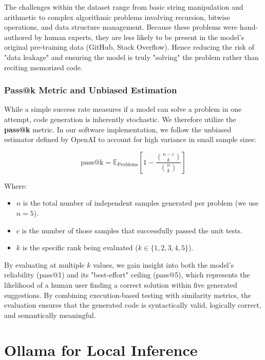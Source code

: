 The challenges within the dataset range from basic string manipulation and arithmetic to complex algorithmic problems involving recursion, bitwise operations, and data structure management. Because these problems were hand-authored by human experts, they are less likely to be present in the model's original pre-training data (GitHub, Stack Overflow). Hence reducing the risk of "data leakage" and ensuring the model is truly "solving" the problem rather than reciting memorized code.

\subsubsection{Pass@k Metric and Unbiased Estimation}
While a simple success rate measures if a model can solve a problem in one attempt, code generation is inherently stochastic. We therefore utilize the \textbf{pass@k} metric. In our software implementation, we follow the unbiased estimator defined by OpenAI to account for high variance in small sample sizes:

\begin{equation}
\text{pass@k} = \mathbb{E}_{\text{Problems}} \left[ 1 - \frac{\binom{n-c}{k}}{\binom{n}{k}} \right]
\end{equation}

Where:
\begin{itemize}
    \item $n$ is the total number of independent samples generated per problem (we use $n=5$).
    \item $c$ is the number of those samples that successfully passed the unit tests.
    \item $k$ is the specific rank being evaluated ($k \in \{1, 2, 3, 4, 5\}$).
\end{itemize}
By evaluating at multiple $k$ values, we gain insight into both the model's reliability (pass@1) and its "best-effort" ceiling (pass@5), which represents the likelihood of a human user finding a correct solution within five generated suggestions.
By combining execution-based testing with similarity metrics, the evaluation ensures that the generated code is syntactically valid, logically correct, and semantically meaningful.


\section{Ollama for Local Inference}

